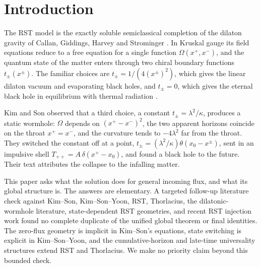 \documentclass[11pt]{article}
\theoremstyle{remark}
\begin{document}
\begin{abstract}
net outgoing flux in the asymptotically flat frame is the constant thermal value $\kappa\lambda^2/4$. The algebraic and order-theoretic cores of statements (i), (ii), (v), (vi) and the conditional affine-length bounds behind (iv) are formalized in Lean~4 with Mathlib (77 audited results, no \texttt{sorry}, standard axioms only); physical interpretations not named in Table~\ref{tab:lean} are paper arguments.
\end{abstract}

\section{Introduction}

The RST model \cite{RST} is the exactly soluble semiclassical completion of the dilaton gravity of Callan, Giddings, Harvey and Strominger \cite{CGHS}. In Kruskal gauge its field equations reduce to a free equation for a single function $\Omega(x^+,x^-)$, and the quantum state of the matter enters through two chiral boundary functions $t_\pm(x^\pm)$. The familiar choices are $t_\pm=1/(4(x^\pm)^2)$, which gives the linear dilaton vacuum and evaporating black holes, and $t_\pm=0$, which gives the eternal black hole in equilibrium with thermal radiation \cite{RST,FPST,Solodukhin}.

Kim and Son \cite{KimSon} observed that a third choice, a constant $t_\pm=\lambda^2/\kappa$, produces a static wormhole: $\Omega$ depends on $(x^+-x^-)^2$, the two apparent horizons coincide on the throat $x^+=x^-$, and the curvature tends to $-4\lambda^2$ far from the throat. They switched the constant off at a point, $t_\pm=(\lambda^2/\kappa)\theta(x_0-x^\pm)$, sent in an impulsive shell $T_{++}=A\,\delta(x^+-x_0)$, and found a black hole to the future. Their text attributes the collapse to the infalling matter.

This paper asks what the solution does for general incoming flux, and what its global structure is. The answers are elementary. A targeted follow-up literature check against Kim--Son, Kim--Son--Yoon, RST, Thorlacius, the dilatonic-wormhole literature, state-dependent RST geometries, and recent RST injection work found no complete duplicate of the unified global theorem or final identities. The zero-flux geometry is implicit in Kim--Son's equations, state switching is explicit in Kim--Son--Yoon, and the cumulative-horizon and late-time universality structures extend RST and Thorlacius. We make no priority claim beyond this bounded check.
\end{document}
